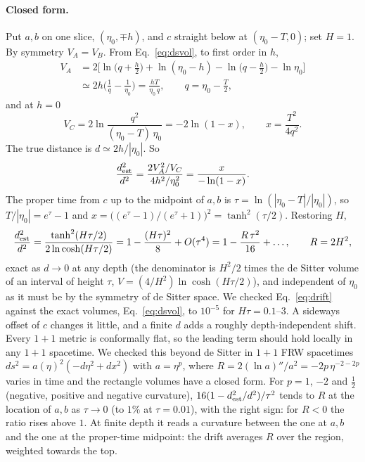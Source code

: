 \documentclass[11pt,a4paper]{article}
\begin{document}
\paragraph{Closed form.} Put $a,b$ on one slice, $(\eta_0,\mp h)$, and $c$ straight below at $(\eta_0-T,0)$; set $H=1$. By symmetry $V_A=V_B$. From Eq.~\eqref{eq:dsvol}, to first order in $h$,
\begin{equation}
\begin{aligned}
V_A&=2\Big[\ln\big(q+\tfrac h2\big)+\ln(\eta_0-h)-\ln\big(q-\tfrac h2\big)-\ln\eta_0\Big]\\
&\simeq2h\Big(\frac1q-\frac1{\eta_0}\Big)=\frac{hT}{\eta_0\,q},\qquad q=\eta_0-\tfrac T2,
\end{aligned}
\end{equation}
and at $h=0$
\begin{equation}
V_C=2\ln\frac{q^2}{(\eta_0-T)\,\eta_0}=-2\ln(1-x),\qquad x=\frac{T^2}{4q^2}.
\end{equation}
The true distance is $d\simeq2h/|\eta_0|$. So
\begin{equation}
\frac{d^2_{\rm est}}{d^2}=\frac{2V_A^2/V_C}{4h^2/\eta_0^2}=\frac{x}{-\ln(1-x)}.
\end{equation}
The proper time from $c$ up to the midpoint of $a,b$ is $\tau=\ln(|\eta_0-T|/|\eta_0|)$, so $T/|\eta_0|=e^{\tau}-1$ and $x=\big((e^\tau-1)/(e^\tau+1)\big)^2=\tanh^2(\tau/2)$. Restoring $H$,
\begin{equation}
\frac{d^2_{\rm est}}{d^2}=\frac{\tanh^2(H\tau/2)}{2\ln\cosh(H\tau/2)}=1-\frac{(H\tau)^2}{8}+O(\tau^4)=1-\frac{R\,\tau^2}{16}+\dots,\qquad R=2H^2,
\label{eq:drift}
\end{equation}
exact as $d\to0$ at any depth (the denominator is $H^2/2$ times the de Sitter volume of an interval of height $\tau$, $V=(4/H^2)\ln\cosh(H\tau/2)$), and independent of $\eta_0$ as it must be by the symmetry of de Sitter space. We checked Eq.~\eqref{eq:drift} against the exact volumes, Eq.~\eqref{eq:dsvol}, to $10^{-5}$ for $H\tau=0.1$--$3$. A sideways offset of $c$ changes it little, and a finite $d$ adds a roughly depth-independent shift. Every $1+1$ metric is conformally flat, so the leading term should hold locally in any $1+1$ spacetime. We checked this beyond de Sitter in $1+1$ FRW spacetimes $ds^2=a(\eta)^2(-d\eta^2+dx^2)$ with $a=\eta^p$, where $R=2(\ln a)''/a^2=-2p\,\eta^{-2-2p}$ varies in time and the rectangle volumes have a closed form. For $p=1$, $-2$ and $\tfrac12$ (negative, positive and negative curvature), $16(1-d^2_{\rm est}/d^2)/\tau^2$ tends to $R$ at the location of $a,b$ as $\tau\to0$ (to $1\%$ at $\tau=0.01$), with the right sign: for $R<0$ the ratio rises above $1$. At finite depth it reads a curvature between the one at $a,b$ and the one at the proper-time midpoint: the drift averages $R$ over the region, weighted towards the top.
\end{document}
